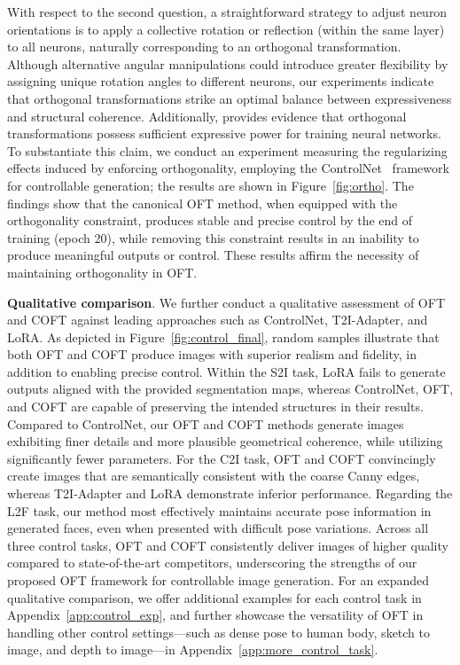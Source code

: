 \begin{itemize}[leftmargin=*,nosep]
With respect to the second question, a straightforward strategy to adjust neuron orientations is to apply a collective rotation or reflection (within the same layer) to all neurons, naturally corresponding to an orthogonal transformation. Although alternative angular manipulations could introduce greater flexibility by assigning unique rotation angles to different neurons, our experiments indicate that orthogonal transformations strike an optimal balance between expressiveness and structural coherence. Additionally, \cite{liu2021orthogonal} provides evidence that orthogonal transformations possess sufficient expressive power for training neural networks. To substantiate this claim, we conduct an experiment measuring the regularizing effects induced by enforcing orthogonality, employing the ControlNet~\cite{zhang2023adding} framework for controllable generation; the results are shown in Figure~\ref{fig:ortho}. The findings show that the canonical OFT method, when equipped with the orthogonality constraint, produces stable and precise control by the end of training (epoch 20), while removing this constraint results in an inability to produce meaningful outputs or control. These results affirm the necessity of maintaining orthogonality in OFT.

\textbf{Qualitative comparison}. We further conduct a qualitative assessment of OFT and COFT against leading approaches such as ControlNet, T2I-Adapter, and LoRA. As depicted in Figure~\ref{fig:control_final}, random samples illustrate that both OFT and COFT produce images with superior realism and fidelity, in addition to enabling precise control. Within the S2I task, LoRA fails to generate outputs aligned with the provided segmentation maps, whereas ControlNet, OFT, and COFT are capable of preserving the intended structures in their results. Compared to ControlNet, our OFT and COFT methods generate images exhibiting finer details and more plausible geometrical coherence, while utilizing significantly fewer parameters. For the C2I task, OFT and COFT convincingly create images that are semantically consistent with the coarse Canny edges, whereas T2I-Adapter and LoRA demonstrate inferior performance. Regarding the L2F task, our method most effectively maintains accurate pose information in generated faces, even when presented with difficult pose variations. Across all three control tasks, OFT and COFT consistently deliver images of higher quality compared to state-of-the-art competitors, underscoring the strengths of our proposed OFT framework for controllable image generation. For an expanded qualitative comparison, we offer additional examples for each control task in Appendix~\ref{app:control_exp}, and further showcase the versatility of OFT in handling other control settings—such as dense pose to human body, sketch to image, and depth to image—in Appendix~\ref{app:more_control_task}.


\end{itemize}

